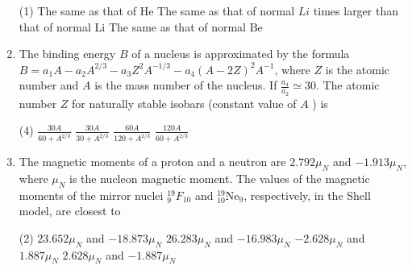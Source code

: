 \begin{enumerate}
	{	}
	\begin{tasks}(1)
		\task[\textbf{A.}] The same as that of $\mathrm{He}$
		\task[\textbf{B.}] The same as that of normal $L i$
		 times larger than that of normal $\mathrm{Li}$
		\task[\textbf{D.}]  The same as that of normal $\mathrm{Be}$
	\end{tasks}
	\item The binding energy $B$ of a nucleus is approximated by the formula $B=a_{1} A-a_{2} A^{2 / 3}-a_{3} Z^{2} A^{-1 / 3}-a_{4}(A-2 Z)^{2} A^{-1}$, where $Z$ is the atomic number and $A$ is the mass number of the nucleus. If $\frac{a_{4}}{a_{2}} \simeq 30$. The atomic number $Z$ for naturally stable isobars (constant value of $A$ ) is
	{	}
	\begin{tasks}(4)
		\task[\textbf{A.}]  $\frac{30 A}{60+A^{2 / 3}}$
		\task[\textbf{B.}] $\frac{30 A}{30+A^{2 / 3}}$
		\task[\textbf{C.}]  $\frac{60 A}{120+A^{2 / 3}}$
		\task[\textbf{D.}] $\frac{120 A}{60+A^{2 / 3}}$
	\end{tasks}
	\item The magnetic moments of a proton and a neutron are $2.792 \mu_{N}$ and $-1.913 \mu_{N}$, where $\mu_{N}$ is the nucleon magnetic moment. The values of the magnetic moments of the mirror nuclei ${ }_{9}^{19} F_{10}$ and ${ }_{10}^{19} \mathrm{Ne}_{9}$, respectively, in the Shell model, are closest to
	{	}
	\begin{tasks}(2)
		\task[\textbf{A.}] $23.652 \mu_{N}$ and $-18.873 \mu_{N}$
		\task[\textbf{B.}] $26.283 \mu_{N}$ and $-16.983 \mu_{N}$
		\task[\textbf{C.}] $-2.628 \mu_{N}$ and $1.887 \mu_{N}$
		\task[\textbf{D.}] $2.628 \mu_{N}$ and $-1.887 \mu_{N}$
	\end{tasks}
\end{enumerate}
\setlength\arrayrulewidth{1pt}
